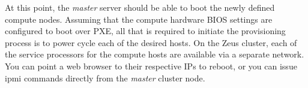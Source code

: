 At this point, the {\em master} server should be able to boot the newly defined
compute nodes. Assuming that the compute hardware BIOS settings are configured
to boot over PXE, all that is required to initiate the provisioning process is to power
cycle each of the desired hosts.  On the Zeus cluster, each of the service
processors for the compute hosts are available via a separate network.
You can point a web browser to their respective IPs to reboot, or
you can issue ipmi commands directly from the {\em master} cluster node.  

